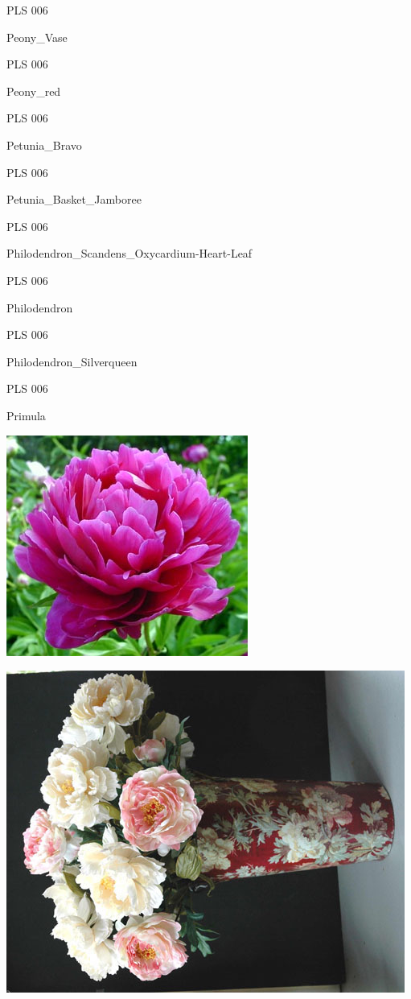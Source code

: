 \documentclass{article}
\begin{document}
\noindent  PLS 006
\vfill
\centerline{{\huge Peony\_Vase }}
\vfill
\newpage

\noindent  PLS 006
\vfill
\centerline{{\huge Peony\_red }}
\vfill
\newpage

\noindent  PLS 006
\vfill
\centerline{{\huge Petunia\_Bravo }}
\vfill
\newpage

\noindent  PLS 006
\vfill
\centerline{{\huge Petunia\_Basket\_Jamboree }}
\vfill
\newpage

\noindent  PLS 006
\vfill
\centerline{{\huge Philodendron\_Scandens\_Oxycardium-Heart-Leaf }}
\vfill
\newpage

\noindent  PLS 006
\vfill
\centerline{{\huge Philodendron }}
\vfill
\newpage

\noindent  PLS 006
\vfill
\centerline{{\huge Philodendron\_Silverqueen }}
\vfill
\newpage

\noindent  PLS 006
\vfill
\centerline{{\huge Primula }}
\vfill
\newpage

\begin{center}
\includegraphics[height=0.925\paperheight]{../Peony_red.jpg}
\end{center}
\newpage

\begin{center}
\includegraphics[height=0.925\paperheight]{../Peony_Vase.jpg}
\end{center}
\newpage
\end{document}
